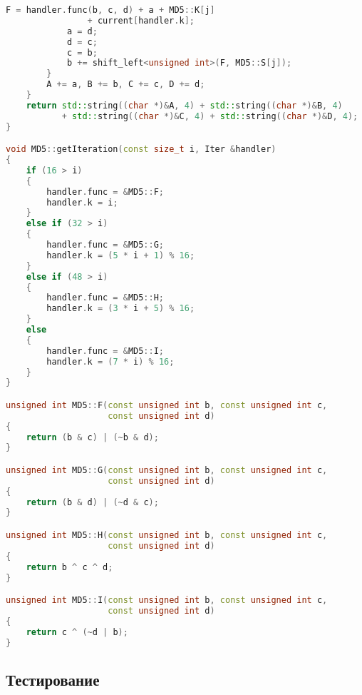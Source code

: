 \begin{lstlisting}[language=c++, caption={Класс, реализующий алгоритм MD5}]
            F = handler.func(b, c, d) + a + MD5::K[j]
                + current[handler.k];
            a = d;
            d = c;
            c = b;
            b += shift_left<unsigned int>(F, MD5::S[j]);
        }
        A += a, B += b, C += c, D += d;
    }
    return std::string((char *)&A, 4) + std::string((char *)&B, 4)
           + std::string((char *)&C, 4) + std::string((char *)&D, 4);
}

void MD5::getIteration(const size_t i, Iter &handler)
{
    if (16 > i)
    {
        handler.func = &MD5::F;
        handler.k = i;
    }
    else if (32 > i)
    {
        handler.func = &MD5::G;
        handler.k = (5 * i + 1) % 16;
    }
    else if (48 > i)
    {
        handler.func = &MD5::H;
        handler.k = (3 * i + 5) % 16;
    }
    else
    {
        handler.func = &MD5::I;
        handler.k = (7 * i) % 16;
    }
}

unsigned int MD5::F(const unsigned int b, const unsigned int c,
                    const unsigned int d)
{
    return (b & c) | (~b & d);
}

unsigned int MD5::G(const unsigned int b, const unsigned int c,
                    const unsigned int d)
{
    return (b & d) | (~d & c);
}

unsigned int MD5::H(const unsigned int b, const unsigned int c,
                    const unsigned int d)
{
    return b ^ c ^ d;
}

unsigned int MD5::I(const unsigned int b, const unsigned int c,
                    const unsigned int d)
{
    return c ^ (~d | b);
}
\end{lstlisting}

\subsection{Тестирование}

\vspace{-2\baselineskip}

